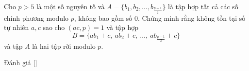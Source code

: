 \ifshowproblem
\begin{problem}\label{problem:IRN-2015-MO3-NP3}
	Cho $p > 5$ là một số nguyên tố và $A = \{b_1, b_2, \dots, b_{\frac{p-1}{2}}\}$ là tập hợp tất cả các số chính phương modulo $p$,
	không bao gồm số $0$. Chứng minh rằng không tồn tại số tự nhiên $a, c$ sao cho $(ac, p) = 1$ và tập hợp  
	\[
		B = \{ ab_1 + c,\ ab_2 + c,\ \dots,\ ab_{\frac{p-1}{2}} + c \}
	\]  
	và tập $A$ là hai tập rời modulo $p$.
\end{problem}
\fi

\ifshowinfo
Đánh giá [\textbf{}]\footnotemark
{}
\fi